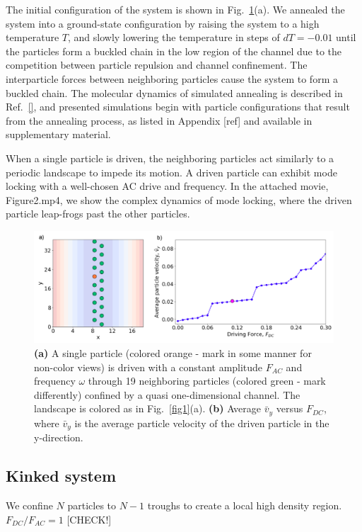 \documentclass[prb,preprint]{revtex4}
\begin{document}
The initial configuration of the system is shown in 
Fig.~\ref{fig:2}(a).  
We annealed the system into a ground-state configuration
by raising the system to a high temperature $T$,
and slowly lowering the temperature in steps of $dT=-0.01$
until the particles form a buckled chain in the low region of the channel
due to the
competition between particle repulsion and channel confinement.
The interparticle forces between neighboring particles
cause the system to form a buckled chain. %
The molecular dynamics of simulated annealing
is described in Ref.~\ref{},
and presented simulations begin with particle configurations
that result from the annealing process,
as listed in Appendix [ref] and available in supplementary material.

When a single particle is driven, the neighboring particles act similarly to a periodic landscape to impede its motion. A driven particle can exhibit mode locking with a well-chosen AC drive and frequency. In the attached movie, Figure2.mp4, we show the complex dynamics of mode locking, where the driven particle leap-frogs past the other particles. 

\begin{center}
\begin{figure}[h!]
\centering
\includegraphics[scale=.40]{twenty}
\caption{\textbf{(a)} A single particle (colored orange - mark in some manner for non-color views) is driven with a constant amplitude $F_{AC}$ and frequency $\omega$ through 19 neighboring particles (colored green - mark differently) confined by a quasi one-dimensional channel. The landscape is colored as in Fig.~\ref{fig1}(a). \textbf{(b)} Average $\bar{v}_{y}$ versus $F_{DC}$, where $\bar{v}_{y}$ is the average particle velocity of the driven particle in the y-direction.}
\label{fig:2}
\end{figure}
\end{center}

\subsection{Kinked system}
\label{sec:kink}	%
We confine $N$ particles to $N-1$ troughs to create a
local high density region.
$F_{DC}/F_{AC} = 1$ [CHECK!]
\end{document}
